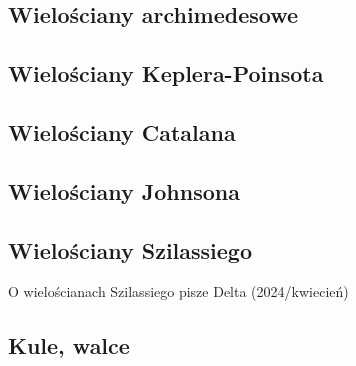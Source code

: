 \subsection{Wielościany archimedesowe}

\subsection{Wielościany Keplera-Poinsota}


\subsection{Wielościany Catalana}


\subsection{Wielościany Johnsona}


\subsection{Wielościany Szilassiego}
O wielościanach Szilassiego pisze Delta (2024/kwiecień)


\subsection{Kule, walce}
